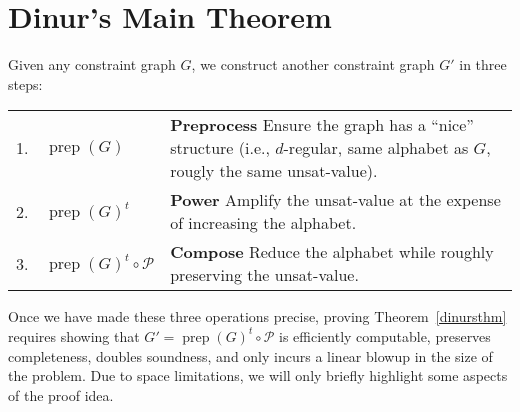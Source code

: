 \documentclass{article}
\newcommand{\N}{{\mathbf N}}
\newcommand{\UNSAT}{\mathsf{UNSAT}}
\newcommand{\prep}{{\operatorname{prep}}}
\begin{document}

\section{Dinur's Main Theorem}\label{proof}

%

Given any constraint graph $G$,
we construct another constraint graph $G'$
in three steps:
\begin{center}
\begin{tabular}{l l p{10cm}}
1. & $\prep(G)$ & \textbf{Preprocess} Ensure the graph has a ``nice'' structure
                   (i.e., $d$-regular, same alphabet as $G$, rougly the same unsat-value). \\
2. & $\prep(G)^t$ & \textbf{Power} Amplify the
                    unsat-value at the expense of increasing the alphabet. \\
3. & $\prep(G)^t \circ \mathcal{P}$ & \textbf{Compose} Reduce the alphabet while roughly
                   preserving the unsat-value.
\end{tabular}
\end{center}
Once we have made these three operations precise,
proving Theorem~\ref{dinursthm} requires showing that $G' = \prep(G)^t \circ \mathcal{P}$ is efficiently
computable, preserves completeness, doubles soundness, and only
incurs a linear blowup in the size of the problem.
Due to space limitations, we will only briefly highlight some
aspects of the proof idea.
\end{document}
